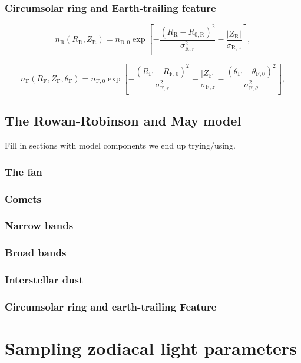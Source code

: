 \documentclass{aa}
\begin{document}
\subsubsection{Circumsolar ring and Earth-trailing feature}
\begin{equation}\label{eq: ring}
    n_\mathrm{R}(R_\mathrm{R}, Z_\mathrm{R})=n_{\mathrm{R},0} \exp \left[-\frac{\left(R_\mathrm{R}-R_{0, \mathrm{R}}\right)^2}{\sigma_{\mathrm{R}, r} ^2}-\frac{\left| Z_\mathrm{R} \right|}{\sigma_{\mathrm{R}, z}}\right],
\end{equation}

\begin{equation}\label{eq: feature}
   n_\mathrm{F}(R_\mathrm{F}, Z_\mathrm{F}, \theta_\mathrm{F}) = n_{\mathrm{F}, 0} \exp \left[-\frac{\left(R_\mathrm{F}-R_{\mathrm{F}, 0}\right)^{2}}{\sigma_{\mathrm{F}, r}^{2}}-\frac{\left|Z_\mathrm{F}\right|}{\sigma_{\mathrm{F}, z}}-\frac{\left(\theta_\mathrm{F}-\theta_{\mathrm{F}, 0}\right)^{2}}{\sigma_{\mathrm{F}, \theta }^{2}}\right],
\end{equation}

\subsection{The Rowan-Robinson and May model}
Fill in sections with model components we end up trying/using.
\subsubsection{The fan}
\subsubsection{Comets}
\subsubsection{Narrow bands}
\subsubsection{Broad bands}
\subsubsection{Interstellar dust}
\subsubsection{Circumsolar ring and earth-trailing Feature}


\section{Sampling zodiacal light parameters}
\end{document}
